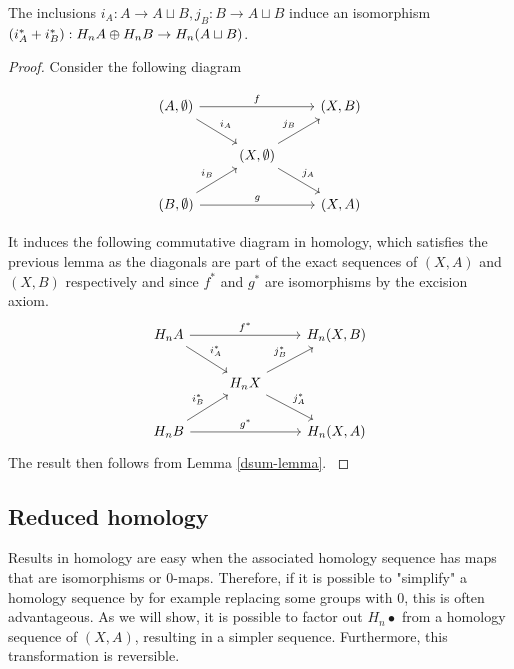 \begin{prop}\label{disjoint-union}
The inclusions $i_A:A\rightarrow A\sqcup B,j_B:B\rightarrow A\sqcup B$ induce an isomorphism $(i_A^*+i_B^*):H_n A\oplus H_n B \rightarrow H_n(A\sqcup B)$.
\end{prop}
\begin{proof}
Consider the following diagram

\[\begin{tikzcd}
{(A,\emptyset)} \arrow[rd, "i_A"] \arrow[rr, "f"] &                                                     & {(X,B)} \\
                                                  & {(X,\emptyset)} \arrow[ru, "j_B"] \arrow[rd, "j_A"] &         \\
{(B,\emptyset)} \arrow[ru, "i_B"] \arrow[rr, "g"] &                                                     & {(X,A)}
\end{tikzcd}\]

It induces the following commutative diagram in homology, which satisfies the previous lemma as the diagonals are part of the exact sequences of $(X,A)$ and $(X,B)$ respectively and since $f^*$ and $g^*$ are isomorphisms by the excision axiom.
\[\begin{tikzcd}
H_nA \arrow[rd, "i_A^*"] \arrow[rr, "f^*"] &                                              & {H_n(X,B)} \\
                                           & H_nX \arrow[ru, "j_B^*"] \arrow[rd, "j_A^*"] &            \\
H_nB \arrow[ru, "i_B^*"] \arrow[rr, "g^*"] &                                              & {H_n(X,A)}
\end{tikzcd}\]
The result then follows from Lemma \ref{dsum-lemma}.
\cite{Werndli}
\end{proof}


\subsection{Reduced homology}
Results in homology are easy when the associated homology sequence has maps that are isomorphisms or $0$-maps. Therefore, if it is possible to "simplify" a homology sequence by for example replacing some groups with $0$, this is often advantageous. As we will show, it is possible to factor out $H_n\bullet$ from a homology sequence of $(X,A)$, resulting in a simpler sequence. Furthermore, this transformation is reversible.

